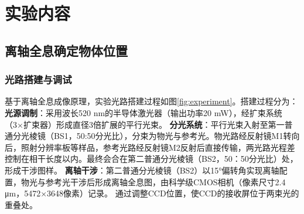 \documentclass[a4paper,draft]{report} %
\begin{document}
\chapter{实验内容}
\section{离轴全息确定物体位置}
\subsection{光路搭建与调试}
基于离轴全息成像原理，实验光路搭建过程如图\ref{fig:experiment}。搭建过程分为：
\textbf{光源调制}：采用波长520 nm的半导体激光器（输出功率20 mW），经扩束系统（3×扩束器）形成直径3倍扩展的平行光束。
\textbf{分光系统}：平行光束入射至第一普通分光棱镜（BS1，50:50分光比），分束为物光与参考光。物光路经反射镜M1转向后，照射分辨率板等样品，参考光路经反射镜M2反射后直接传输，两光路光程差控制在相干长度以内。最终会合在第二普通分光棱镜（BS2，50：50分光比）处，形成干涉图样。
\textbf{离轴干涉}：第二普通分光棱镜（BS2）以15°偏转角实现离轴配置，物光与参考光干涉后形成离轴全息图，由科学级CMOS相机（像素尺寸2.4 μm，5472×3648像素）记录。
通过调整CCD位置，使CCD的接收屏位于两束光的重叠处。
\end{document}
